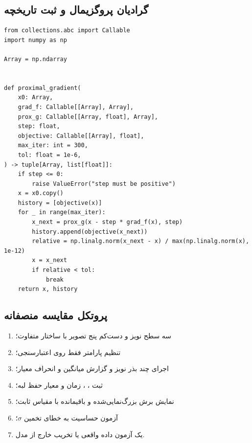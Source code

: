 \documentclass[12pt,openany,oneside]{book}
\begin{document}
\subsection{گرادیان پروگزیمال و ثبت تاریخچه}
\begin{latin}
\begin{lstlisting}
from collections.abc import Callable
import numpy as np

Array = np.ndarray


def proximal_gradient(
    x0: Array,
    grad_f: Callable[[Array], Array],
    prox_g: Callable[[Array, float], Array],
    step: float,
    objective: Callable[[Array], float],
    max_iter: int = 300,
    tol: float = 1e-6,
) -> tuple[Array, list[float]]:
    if step <= 0:
        raise ValueError("step must be positive")
    x = x0.copy()
    history = [objective(x)]
    for _ in range(max_iter):
        x_next = prox_g(x - step * grad_f(x), step)
        history.append(objective(x_next))
        relative = np.linalg.norm(x_next - x) / max(np.linalg.norm(x), 1e-12)
        x = x_next
        if relative < tol:
            break
    return x, history
\end{lstlisting}
\end{latin}

\subsection{پروتکل مقایسه منصفانه}
\begin{enumerate}
\item سه سطح نویز و دست‌کم پنج تصویر با ساختار متفاوت؛
\item تنظیم پارامتر فقط روی اعتبارسنجی؛
\item اجرای چند بذر نویز و گزارش میانگین و انحراف معیار؛
\item ثبت ، ، زمان و معیار حفظ لبه؛
\item نمایش برش بزرگ‌نمایی‌شده و باقیمانده با مقیاس ثابت؛
\item آزمون حساسیت به خطای تخمین \(\sigma\)؛
\item یک آزمون داده واقعی یا تخریب خارج از مدل.
\end{enumerate}
\end{document}
